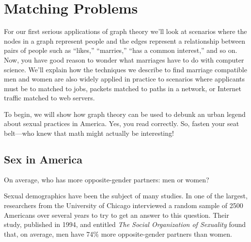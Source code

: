 \begin{problems}
\classproblems
{}

\homeworkproblems
{}

\examproblems
{}
\end{problems}


\section{Matching Problems}\label{sexam}

For our first serious applications of graph theory we'll look at scenarios
where the nodes in a graph represent people and the edges represent a
relationship between pairs of people such as ``likes,'' ``marries,'' ``has
a common interest,'' and so on.  Now, you have good reason to wonder what
marriages have to do with computer science.  We'll explain how the
techniques we describe to find marriage compatible men and women are
also widely applied in practice to scenarios where applicants must be to
matched to jobs, packets matched to paths in a network, or Internet
traffic matched to web servers.  

To begin, we will show how graph theory can be used to debunk an urban
legend about sexual practices in America.  Yes, you read correctly.  So,
fasten your seat belt---who knew that math might actually be interesting!

\subsection{Sex in America}

On average, who has more opposite-gender partners: men or women?

Sexual demographics have been the subject of many studies.  In one of the
largest, researchers from the University of Chicago interviewed a random
sample of 2500 Americans over several years to try to get an answer to this
question.  Their study, published in 1994, and entitled \emph{The Social
  Organization of Sexuality} found that, on average, men have 74\% more
opposite-gender partners than women.

